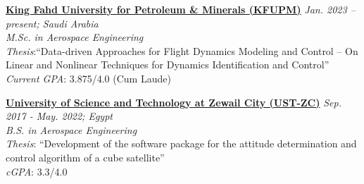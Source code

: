 \href{https://kfupm.edu.sa/}{\textbf{King Fahd University for Petroleum \& Minerals (KFUPM)}}
\hfill {\textit{Jan. 2023 – present; Saudi Arabia}}\\
\textit{M.Sc. in Aerospace Engineering}\\
\textit{Thesis}:``Data-driven Approaches for Flight Dynamics Modeling and Control -- On Linear and Nonlinear Techniques for Dynamics Identification and Control''\\
\textit{Current GPA}: 3.875/4.0 (Cum Laude)

\vspace{0.1 cm}
\href{https://zewailcity.edu.eg/}{\textbf{University of Science and Technology at Zewail City (UST-ZC)}}
\hfill {\textit{Sep. 2017 - May. 2022; Egypt}}\\
\textit{B.S. in Aerospace Engineering}\\
\textit{Thesis}: {``Development of the software package for the attitude determination and control
algorithm of a cube satellite''} \\
\textit{cGPA}: 3.3/4.0